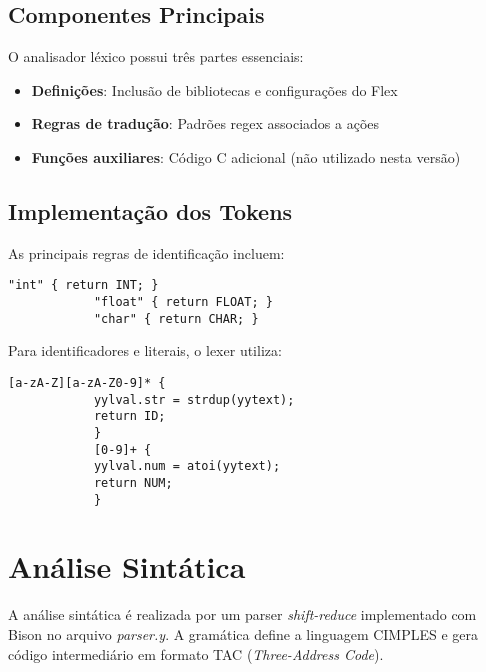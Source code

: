\documentclass[10pt,twocolumn]{article}
\begin{document}
    \subsection{Componentes Principais}

        O analisador léxico possui três partes essenciais:

        \begin{itemize}
            \item \textbf{Definições}: Inclusão de bibliotecas e configurações do Flex
            \item \textbf{Regras de tradução}: Padrões regex associados a ações
            \item \textbf{Funções auxiliares}: Código C adicional (não utilizado nesta versão)
        \end{itemize}

    \subsection{Implementação dos Tokens}

        As principais regras de identificação incluem:

        \begin{lstlisting}[caption=Regras de tipo de dado,captionpos=b]
            "int" { return INT; }
            "float" { return FLOAT; }
            "char" { return CHAR; }
        \end{lstlisting}

        Para identificadores e literais, o lexer utiliza:

        \begin{lstlisting}[caption=Construção para nome de variáveis e valores,captionpos=b]
            [a-zA-Z][a-zA-Z0-9]* {
            yylval.str = strdup(yytext);
            return ID;
            }
            [0-9]+ {
            yylval.num = atoi(yytext);
            return NUM;
            }
        \end{lstlisting}

\section{Análise Sintática}
        A análise sintática é realizada por um parser \textit{shift-reduce} implementado 
        com Bison no arquivo \textit{parser.y}. A gramática define a linguagem CIMPLES e 
        gera código intermediário em formato TAC (\textit{Three-Address Code}).
\end{document}
